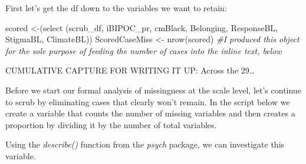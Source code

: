 \documentclass[
  english,
]{book}
\newenvironment{Shaded}{\begin{snugshade}}{\end{snugshade}}
\newcommand{\AttributeTok}[1]{\textcolor[rgb]{0.77,0.63,0.00}{#1}}
\newcommand{\CommentTok}[1]{\textcolor[rgb]{0.56,0.35,0.01}{\textit{#1}}}
\newcommand{\DecValTok}[1]{\textcolor[rgb]{0.00,0.00,0.81}{#1}}
\newcommand{\FunctionTok}[1]{\textcolor[rgb]{0.00,0.00,0.00}{#1}}
\newcommand{\NormalTok}[1]{#1}
\newcommand{\OtherTok}[1]{\textcolor[rgb]{0.56,0.35,0.01}{#1}}
\newcommand{\SpecialCharTok}[1]{\textcolor[rgb]{0.00,0.00,0.00}{#1}}
\begin{document}
First let's get the df down to the variables we want to retain:

\begin{Shaded}
\begin{Highlighting}[]
\NormalTok{scored }\OtherTok{\textless{}{-}}\NormalTok{(}\FunctionTok{select}\NormalTok{ (scrub\_df, iBIPOC\_pr, cmBlack, Belonging, ResponseBL, StigmaBL, ClimateBL))}
\NormalTok{ScoredCaseMiss }\OtherTok{\textless{}{-}} \FunctionTok{nrow}\NormalTok{(scored) }\CommentTok{\#I produced this object for the sole purpose of feeding the number of cases into the inline text, below}
\end{Highlighting}
\end{Shaded}

CUMULATIVE CAPTURE FOR WRITING IT UP: Across the 29\ldots{}

Before we start our formal analysis of missingness at the scale level, let's continue to scrub by eliminating cases that clearly won't remain. In the script below we create a variable that counts the number of missing variables and then creates a proportion by dividing it by the number of total variables.

Using the \emph{describe()} function from the \emph{psych} package, we can investigate this variable.

\begin{Shaded}
\end{Shaded}
\end{document}
